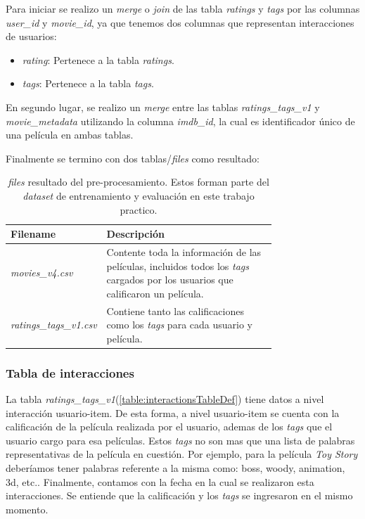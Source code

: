 \documentclass[11pt,a4paper,twoside]{thesis}
\begin{document}
Para iniciar se realizo un \textit{merge} o \textit{join} de las tabla \textit{ratings} y \textit{tags} por las columnas \textit{user\_id} y \textit{movie\_id}, ya que tenemos dos columnas que representan interacciones de usuarios: 

\begin{itemize}
	\item \textit{rating}: Pertenece a la tabla \textit{ratings}.
	\item \textit{tags}: Pertenece a la tabla \textit{tags}.
\end{itemize}

En segundo lugar, se realizo un \textit{merge} entre las tablas \textit{ratings\_tags\_v1} y \textit{movie\_metadata} utilizando la columna \textit{imdb\_id}, la cual es identificador único de una película en ambas tablas.

Finalmente se termino con dos tablas/\textit{files} como resultado:

\begin{table}[!htb]
	\centering
	\footnotesize
	\begin{tabular}{l | p{0.75\linewidth}}
	\hline
		Filename            & Descripción \\
	\hline
	\textit{movies\_v4.csv} & Contente toda la información de las películas, incluidos todos los \textit{tags} cargados por los usuarios que calificaron un película. \\
	\textit{ratings\_tags\_v1.csv} & Contiene tanto las calificaciones como los \textit{tags} para cada usuario y película. \\
	\hline
	\end{tabular}
	\caption{
		\textit{files} resultado del pre-procesamiento. Estos forman parte del \textit{dataset} de entrenamiento y evaluación en este trabajo practico.
	}
	\label{table:tableFiles}
\end{table}

\subsubsection{Tabla de interacciones}

La tabla \textit{ratings\_tags\_v1}(\ref{table:interactionsTableDef}) tiene datos a nivel interacción usuario-item. De esta forma, a nivel usuario-item se cuenta con la calificación de la película realizada por el usuario, ademas de los \textit{tags} que el usuario cargo para esa películas. Estos \textit{tags} no son mas que una lista de palabras representativas de la película en cuestión. Por ejemplo, para la película \textit{Toy Story} deberíamos tener palabras referente a la misma como: boss, woody, animation, 3d, etc.. Finalmente, contamos con la fecha en la cual se realizaron esta interacciones. Se entiende que la calificación y los \textit{tags} se ingresaron en el mismo momento.
\end{document}
